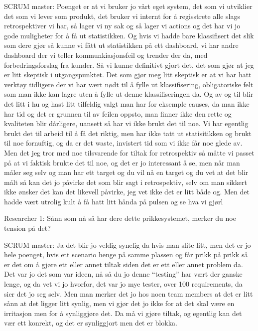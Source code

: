 SCRUM master: Poenget er at vi bruker jo vårt eget system, det som vi utviklier det som vi lever som produkt, det bruker vi internt for å regisstrete alle slags retrospektiver vi har, så lager vi ny sak og så lager vi actions og det har vi jo gode muligheter for å få ut statistikken. Og hvis vi hadde bare klassifisert det slik som dere gjør så kunne vi fått ut statistikken på ett dashboard, vi har andre dashboard der vi teller kommunkiasjonsfeil og trender der da, med forbedringsforslag fra kunder. Så vi kunne definitivt gjort det, det som gjør at jeg er litt skeptisk i utgangspunktet. Det som gjør meg litt skeptisk er at vi har hatt verktøy tidligere der vi har vært nødt til å fylle ut klassifisering, obligatoriske felt som man ikke kan lagre uten å fylle ut denne klassifiseringen da. Og av og til blir det litt i hu og hast litt tilfeldig valgt man har for eksemple causes, da man ikke har tid og det er grunnen til av feilen oppsto, man finner ikke den rette og kvaliteten blir dårligere, uansett så har vi ikke brukt det til noe. Vi har egentlig brukt det til arbeid til å få det riktig, men har ikke tatt ut statisitikken og brukt til noe fornuftig, og da er det waste, invistert tid som vi ikke får noe glede av. Men det jeg tror med noe tilsvarende for tiltak for retrospektiv så måtte vi passet på at vi faktisk brukte det til noe, og det er jo interessant å se, men når man måler seg selv og man har ett target og du vil nå en target og du vet at det blir målt så kan det jo påvirke det som blir sagt i retrospektiv, selv om man sikkert ikke ønsker det kan det likevell påvirke, jeg vet ikke det er litt både og. Men det hadde vært utrolig kult å få hatt litt hånda på pulsen og se hva vi gjørl

Researcher 1: Sånn som nå så har dere dette prikkesystemet, merker du noe tension på det?

SCRUM master: Ja det blir jo veldig synelig da hvis man slite litt, men det er jo hele poenget, hvis ett scenario henge på samme plassen og får prikk på prikk så er det om å gjøre ett eller annet tiltak siden det er ett eller annet problem da. Det var jo det som var ideen, nå så du jo denne ``testing'' har vært der ganske lenge, og da vet vi jo hvorfor, det var jo mye tester, over 100 requirements, da sier det jo seg selv. Men man merker det jo hos noen team members at det er litt sånn at det ligger litt synlig, men vi gjør det jo ikke for at det skal være en irritasjon men for å synliggjøre det. Da må vi gjøre tiltak, og egentlig kan det vær ett konrekt, og det er synliggjort men det er blokka. 

